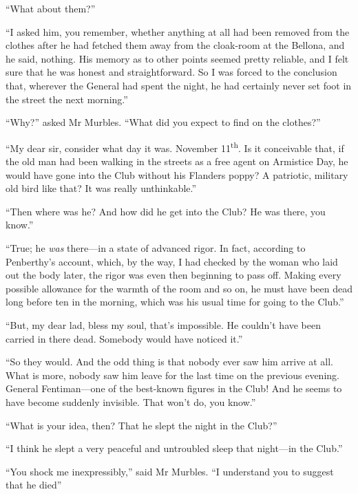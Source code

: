 \enquote{What about them?}

\enquote{I asked him, you remember, whether anything at all had been removed from the clothes after he had fetched them away from the cloak-room at the Bellona, and he said, nothing. His memory as to other points seemed pretty reliable, and I felt sure that he was honest and straightforward. So I was forced to the conclusion that, wherever the General had spent the night, he had certainly never set foot in the street the next morning.}

\enquote{Why?} asked Mr Murbles. \enquote{What did you expect to find on the clothes?}

\enquote{My dear sir, consider what day it was. November  11\textsuperscript{th}. Is it conceivable that, if the old man had been walking in the streets as a free agent on Armistice Day, he would have gone into the Club without his Flanders poppy? A patriotic, military old bird like that? It was really unthinkable.}

\enquote{Then where was he? And how did he get into the Club? He was there, you know.}

\enquote{True; he \textit{was} there\allowbreak---\allowbreak in a state of advanced rigor. In fact, according to Penberthy's account, which, by the way, I had checked by the woman who laid out the body later, the rigor was even then beginning to pass off. Making every possible allowance for the warmth of the room and so on, he must have been dead long before ten in the morning, which was his usual time for going to the Club.}

\enquote{But, my dear lad, bless my soul, that's impossible. He couldn't have been carried in there dead. Somebody would have noticed it.}

\enquote{So they would. And the odd thing is that nobody ever saw him arrive at all. What is more, nobody saw him leave for the last time on the previous evening. General Fentiman\allowbreak---\allowbreak one of the best-known figures in the Club! And he seems to have become suddenly invisible. That won't do, you know.}

\enquote{What is your idea, then? That he slept the night in the Club?}

\enquote{I think he slept a very peaceful and untroubled sleep that night\allowbreak---\allowbreak in the Club.}

\enquote{You shock me inexpressibly,} said Mr Murbles. \enquote{I understand you to suggest that he died\longdash}

